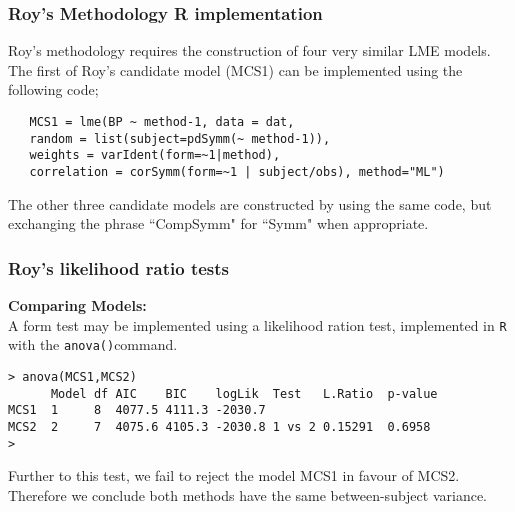  
\begin{frame}[fragile]
\frametitle{Roy's Methodology  R implementation}

Roy's methodology requires the construction of four very similar LME models.
The first of Roy's candidate model (MCS1) can be implemented using the following code;\\
\begin{verbatim}
   MCS1 = lme(BP ~ method-1, data = dat,
   random = list(subject=pdSymm(~ method-1)),
   weights = varIdent(form=~1|method),
   correlation = corSymm(form=~1 | subject/obs), method="ML")
\end{verbatim}
The other three candidate models are constructed by using the same code, but exchanging the phrase ``CompSymm" for ``Symm" when appropriate.
\end{frame}

\begin{frame}[fragile]\frametitle{Roy's likelihood ratio tests}
\textbf{Comparing Models:}\\
A form test may be implemented using a likelihood ration test, implemented in \texttt{R} with the \texttt{anova()}command.
\begin{verbatim}
> anova(MCS1,MCS2)
      Model df AIC    BIC    logLik  Test   L.Ratio  p-value
MCS1  1     8  4077.5 4111.3 -2030.7
MCS2  2     7  4075.6 4105.3 -2030.8 1 vs 2 0.15291  0.6958
>
\end{verbatim}
Further to this test, we fail to reject the model MCS1 in favour of MCS2.
Therefore we conclude both methods have the same between-subject variance.
\end{frame}






